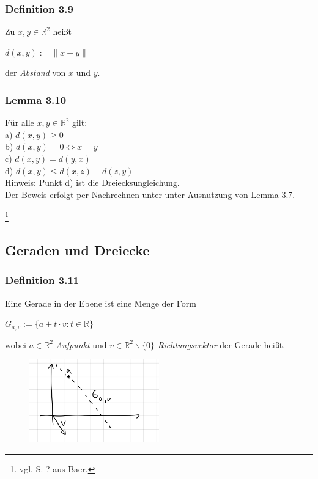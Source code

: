 \documentclass{article}
\begin{document}
\subsubsection*{Definition 3.9}
Zu $x,y \in \mathbb{R}^2$ heißt \\
\begin{center}
    $d(x,y) := \|x-y\|$
\end{center}
der \textit{Abstand} von $x$ und $y$. \\

\subsubsection*{Lemma 3.10}
Für alle $x,y \in \mathbb{R}^2$ gilt: \\
a) $d(x,y) \geq 0$ \\
b) $d(x,y) = 0 \Leftrightarrow x = y$ \\
c) $d(x,y) = d(y,x)$ \\
d) $d(x,y) \leq d(x,z) + d(z,y)$ \\
Hinweis: Punkt d) ist die Dreiecksungleichung. \\
Der Beweis erfolgt per Nachrechnen unter unter Ausnutzung von Lemma 3.7. \\
\newpage
\date{Donnerstag, 30.11.23} \footnote{vgl. S. ? aus Baer.}
\subsection{Geraden und Dreiecke}
\subsubsection*{Definition 3.11}
Eine Gerade in der Ebene ist eine Menge der Form \\
\begin{center}
    $G_{a,v} := \{a + t \cdot v: t \in \mathbb{R}\}$ \\
\end{center}
wobei $a \in \mathbb{R}^2$ \textit{Aufpunkt} und $v \in \mathbb{R}^2\backslash\{0\}$ \textit{Richtungsvektor} der Gerade heißt. \\
\begin{figure}[h]
    \centering
    \includegraphics[width=0.5\textwidth]{Images/3.11.jpeg}
    \caption{}
\end{figure}
\end{document}
